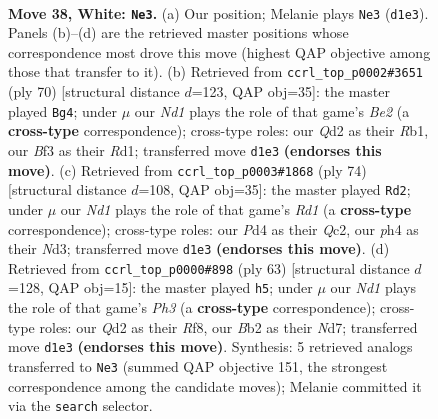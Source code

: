 \documentclass[11pt]{article}
\begin{document}
\clearpage

\begin{figure}[p]\centering
\begin{subfigure}{0.46\textwidth}\centering
\resizebox{\linewidth}{!}{%
\newchessgame
\chessboard[
  setfen={1n1qkbr1/4n3/r1p3p1/3p2P1/3P1P1p/1P3B1P/1B1Q3R/2RN1K2 w - - 5 38},
  showmover=false,
  pgfstyle=straightmove, color=movearrow, markmove={d1-e3}
]}
\caption{}
\end{subfigure}\hfill
\begin{subfigure}{0.46\textwidth}\centering
\resizebox{\linewidth}{!}{%
\newchessgame
\chessboard[
  setfen={rr2bk2/1p1nqpp1/2p4p/P3p3/4P3/1NP1Q2P/4BPPK/1R1R4 w - - 14 36},
  showmover=false,
  pgfstyle=straightmove, color=movearrow, markmove={e2-g4}
]}
\caption{}
\end{subfigure}
\\[4pt]
\begin{subfigure}{0.46\textwidth}\centering
\resizebox{\linewidth}{!}{%
\newchessgame
\chessboard[
  setfen={4q3/p2n2bk/2p1rnp1/Pp3p1p/3P1B1P/2PN1BP1/1PQ5/3R2K1 w - - 4 38},
  showmover=false,
  pgfstyle=straightmove, color=movearrow, markmove={d1-d2}
]}
\caption{}
\end{subfigure}\hfill
\begin{subfigure}{0.46\textwidth}\centering
\resizebox{\linewidth}{!}{%
\newchessgame
\chessboard[
  setfen={2b2rk1/3n2q1/r2p3p/2pP2p1/5p2/1RN3P1/4PPBP/1QR3K1 b - - 10 32},
  showmover=false,
  pgfstyle=straightmove, color=movearrow, markmove={h6-h5}
]}
\caption{}
\end{subfigure}
\caption{\textbf{Move 38, White: \texttt{Ne3}.} (a) Our position; Melanie plays \texttt{Ne3} (\texttt{d1e3}). Panels (b)--(d) are the retrieved master positions whose correspondence most drove this move (highest QAP objective among those that transfer to it). (b) Retrieved from \texttt{ccrl\_top\_p0002\#3651} (ply 70) [structural distance $d$=123, QAP obj=35]: the master played \texttt{Bg4}; under $\mu$ our \emph{Nd1} plays the role of that game's \emph{Be2} (a \textbf{cross-type} correspondence); cross-type roles: our \emph{Q}d2 as their \emph{R}b1, our \emph{B}f3 as their \emph{R}d1; transferred move \texttt{d1e3} \textbf{(endorses this move)}. (c) Retrieved from \texttt{ccrl\_top\_p0003\#1868} (ply 74) [structural distance $d$=108, QAP obj=35]: the master played \texttt{Rd2}; under $\mu$ our \emph{Nd1} plays the role of that game's \emph{Rd1} (a \textbf{cross-type} correspondence); cross-type roles: our \emph{P}d4 as their \emph{Q}c2, our \emph{p}h4 as their \emph{N}d3; transferred move \texttt{d1e3} \textbf{(endorses this move)}. (d) Retrieved from \texttt{ccrl\_top\_p0000\#898} (ply 63) [structural distance $d$=128, QAP obj=15]: the master played \texttt{h5}; under $\mu$ our \emph{Nd1} plays the role of that game's \emph{Ph3} (a \textbf{cross-type} correspondence); cross-type roles: our \emph{Q}d2 as their \emph{R}f8, our \emph{B}b2 as their \emph{N}d7; transferred move \texttt{d1e3} \textbf{(endorses this move)}. Synthesis: 5 retrieved analogs transferred to \texttt{Ne3} (summed QAP objective 151, the strongest correspondence among the candidate moves); Melanie committed it via the \texttt{search} selector.}
\label{fig:thought-m74}
\end{figure}
\end{document}
